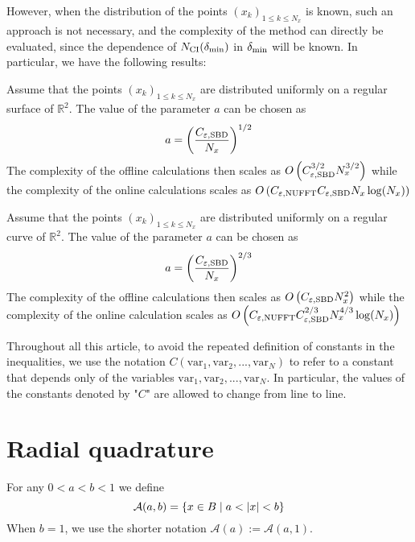 \documentclass[11pt,a4paper]{article}
\begin{document}
However, when the distribution of the points $(x_k)_{1 \leq k \leq N_x}$ is known, such an approach is not necessary, and the complexity of the method can directly be evaluated, since the dependence of $N_{\textup{CI}}(\delta_{\min})$ in $\delta_{\min}$ will be known. In particular, we have the following results: 

\begin{Prop} 
\label{Complex1}
Assume that the points $(x_k)_{1 \leq k \leq {N_x}}$ are distributed uniformly on a regular surface of $\mathbb{R}^2$. The value of the parameter $a$ can be chosen as 
\[ a = \left(\dfrac{C_{\varepsilon,\textup{SBD}}}{N_x}\right)^{1/2}\]
The complexity of the offline calculations then scales as $O\left(C_{\varepsilon,\textup{SBD}}^{3/2} N_x^{3/2}\right)$ while the complexity of the online calculations scales as $O\left(C_{\varepsilon,\textup{NUFFT}} C_{\varepsilon,\textup{SBD}}N_x \log(N_x) \right)$
\end{Prop}

\begin{Prop}
\label{Complex2}
Assume that the points $(x_k)_{1 \leq k \leq {N_x}}$ are distributed uniformly on a regular curve of $\mathbb{R}^2$. The value of the parameter $a$ can be chosen as 
\[ a = \left(\dfrac{C_{\varepsilon,\textup{SBD}}}{N_x}\right)^{2/3}\]
The complexity of the offline calculations then scales as $O\left(C_{\varepsilon,\textup{SBD}} N_x^{2}\right)$ while the complexity of the online calculation scales as $O\left(C_{\varepsilon,\textup{NUFFT}} C_{\varepsilon,\textup{SBD}}^{2/3}N_x^{4/3} \log(N_x) \right)$
\end{Prop}

\begin{Rem} Throughout all this article, to avoid the repeated definition of constants in the inequalities, we use the notation $C(\text{var}_1,\text{var}_2,...,\text{var}_N)$ to refer to a constant that depends only of the variables $\text{var}_1,\text{var}_2,...,\text{var}_N$. In particular, the values of the constants denoted by "$C$" are allowed to change from line to line. 
\end{Rem}

\section{Radial quadrature}
\label{sec:radial}
\begin{Def} For any $0<a<b<1$ we define 
\[\mathcal{A}(a,b) = \left\{x \in B\mathrel{}\middle|\mathrel{} a < |x| < b\right\}\]
When $b = 1$, we use the shorter notation $\mathcal{A}(a) := \mathcal{A}(a,1)$. 
\end{Def}
\end{document}
